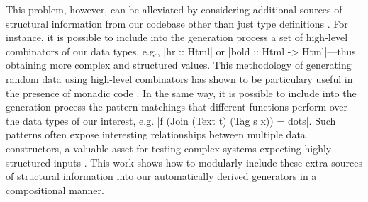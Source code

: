 This problem, however, can be alleviated by considering additional sources of
structural information from our codebase other than just type definitions
\cite{Mista2019GeneratingRS}.
%
%
For instance, it is possible to include into the generation process a set of
high-level combinators of our data types, e.g., |hr :: Html| or |bold :: Html ->
Html|---thus obtaining more complex and structured values.
%
This methodology of generating random data using high-level combinators has
shown to be particulary useful in the presence of monadic code
\cite{Claessen:2002, grieco2017}.
%
%
In the same way, it is possible to include into the generation process the
pattern matchings that different functions perform over the data types of our
interest, e.g. |f (Join (Text t) (Tag s x)) = dots|.
%
Such patterns often expose interesting relationships between multiple data
constructors, a valuable asset for testing complex systems expecting highly
structured inputs \cite{klein2009randomized}.
%
%
This work shows how to modularly include these extra sources of structural
information into our automatically derived generators in a compositional manner.

